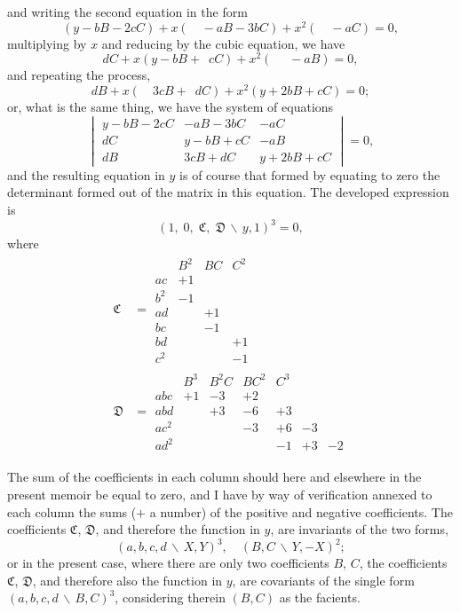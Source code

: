 \documentclass[11pt,a4paper]{article}
\theoremstyle{definition}
\begin{document}
and writing the second equation in the form
\[(y-bB-2cC) + x(\phantom{00}-aB-3bC) + x^{2}(\phantom{00}-aC) = 0,\]
multiplying by $x$ and reducing by the cubic equation, we have
\[dC + x(y-bB+\phantom{1}cC) + x^{2}(\phantom{00\,\,}-aB) = 0,\]
and repeating the process,
\[dB + x(\phantom{00}3cB+\phantom{1}dC) + x^{2}(y+2bB+cC) = 0;\]
or, what is the same thing, we have the system of equations
\[
\begin{vmatrix}
y-bB-2cC & -aB-3bC & -aC \\
dC & y-bB+cC & -aB \\
dB & 3cB+dC & y+2bB+cC
\end{vmatrix}
= 0,
\]
and the resulting equation in $y$ is of course that formed by equating to zero the
determinant formed out of the matrix in this equation. The developed expression is
\[(1,\; 0,\; \mathfrak{C},\; \mathfrak{D}\,\backslash\!\!\,y,1)^{3} = 0,\]
where
\begin{align*}
\mathfrak{C} &=
\begin{array}{c|cccc}
& B^{2} & BC & C^{2} \\
\hline
ac & +1 \\
b^{2} & -1 \\
ad & & +1 \\
bc & & -1 \\
bd & & & +1 \\
c^{2} & & & -1
\end{array}
\\[1em]
\mathfrak{D} &=
\begin{array}{c|ccccccc}
& B^{3} & B^{2}C & BC^{2} & C^{3} \\
\hline
abc & +1 & -3 & +2 \\
abd & & +3 & -6 & +3 \\
ac^{2} & & & -3 & +6 & -3 \\
ad^{2} & & & & -1 & +3 & -2
\end{array}
\end{align*}

The sum of the coefficients in each column should here and elsewhere in the present
memoir be equal to zero, and I have by way of verification annexed to each column the
sums ($+$ a number) of the positive and negative coefficients. The coefficients
$\mathfrak{C}$, $\mathfrak{D}$, and therefore the function in $y$, are invariants of the two
forms,
\[(a,b,c,d\,\backslash\!\!\,X,Y)^{3}, \quad (B,C\,\backslash\!\!\,Y,-X)^{2};\]
or in the present case, where there are only two coefficients $B$, $C$, the coefficients
$\mathfrak{C}$, $\mathfrak{D}$, and therefore also the function in $y$, are covariants of the
single form $(a,b,c,d\,\backslash\!\!\,B,C)^{3}$, considering therein $(B,C)$ as the facients.
\end{document}
